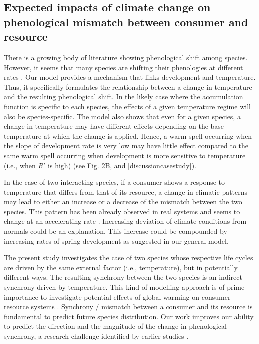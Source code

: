 \documentclass[12 pt]{article}
\begin{document}
\subsection{Expected impacts of climate change on phenological mismatch between consumer and resource}
There is a growing body of literature showing phenological shift among species. However, it seems that many species are shifting their phenologies at different rates \citep{Visser2005,Donnelly2011,Kharouba2018}. Our model provides a mechanism that links development and temperature. Thus, it specifically formulates the relationship between a change in temperature and the resulting phenological shift. In the likely case where the accumulation function is specific to each species, the effects of a given  temperature regime will also be species-specific. The model also shows that even for a given species, a change in temperature may have different effects depending on the base temperature at which the change is applied. Hence, a warm spell occurring when the slope of development rate is very low may have little effect compared to the same warm spell occurring when development is more sensitive to temperature (i.e., when $R'$ is high) (see Fig. 2B, and \ref{discussioncasestudy}).\par 
In the case of two interacting species, if a consumer shows a response to temperature that differs from that of its resource, a change in climatic patterns may lead to either an increase or a decrease of the mismatch between the two species. This pattern has been already observed in real systems and seems to change at an accelerating rate \citep{Kharouba2018}. Increasing deviation of climate conditions from normals could be an explanation. This increase could be compounded by increasing rates of spring development as suggested in our general model.\par
The present study investigates the case of two species whose respective life cycles are driven by the same external factor (i.e., temperature), but in potentially different ways. The resulting synchrony between the two species is an indirect synchrony driven by temperature. This kind of modelling approach is of prime importance to investigate potential effects of global warming on consumer-resource systems \citep{Chuine2017}. Synchrony / mismatch between a consumer and its resource is fundamental to predict future species distribution. Our work improves our ability to predict the direction and the magnitude of the change in phenological synchrony, a research challenge identified by earlier studies \citep{Kharouba2018}.\par
\end{document}

